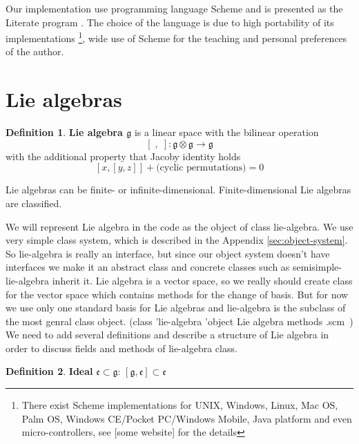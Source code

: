 \documentclass[a4paper,10pt]{article}%
\theoremstyle{definition} \newtheorem{Def}{Definition}
\begin{document}
Our implementation use programming language Scheme and is presented as the Literate program \cite{knuth1992literate}. The choice of the language is due to high portability of its implementations \footnote{There exist Scheme implementations for UNIX, Windows, Linux, Mac OS, Palm OS, Windows CE/Pocket PC/Windows Mobile, Java platform and even micro-controllers, see [some website] for the details}, wide use of Scheme for the teaching \cite{abelson1996structure} and personal preferences of the author. 

\section{Lie algebras}
\label{sec:lie-algebras}

\begin{Def}
  {\bf Lie algebra $\mathfrak{g}$} is a linear space with the bilinear operation
  \begin{equation}
    \label{eq:1}
    \left[\;,\;\right]:\mathfrak{g}\otimes \mathfrak{g}\to \mathfrak{g}
  \end{equation}
  with the additional property that Jacoby identity holds
  \begin{equation}
    \label{eq:2}
    [x,[y,z]]+\text{(cyclic permutations)}=0
  \end{equation}
\end{Def}
Lie algebras can be finite- or infinite-dimensional. Finite-dimensional Lie algebras are classified.

We will represent Lie algebra in the code as the object of class {\Tt{}lie-algebra\nwendquote}. We use very simple class system, which is described in the Appendix \ref{sec:object-system}. So {\Tt{}lie-algebra\nwendquote} is really an interface, but since our object system doesn't have interfaces we make it an abstract class and concrete classes such as {\Tt{}semisimple-lie-algebra\nwendquote} inherit it.
Lie algebra is a vector space, so we really should create class for the vector space which contains methods for the change of basis. But for now we use only one standard basis for Lie algebras and {\Tt{}lie-algebra\nwendquote} is the subclass of the most genral class {\Tt{}object\nwendquote}.
\nwenddocs{}\endmoddef\nwstartdeflinemarkup{}\nwenddeflinemarkup
(class 'lie-algebra 'object
       \LA{}Lie algebra methods .scm~{\nwtagstyle{}}\RA{})
\nwendcode{}\nwdocspar
We need to add several definitions and describe a structure of Lie algebra in order to discuss fields and methods of {\Tt{}lie-algebra\nwendquote} class.
\begin{Def}
  {\bf Ideal} $\mathfrak{e}\subset\mathfrak{g}$: $[\mathfrak{g},\mathfrak{e}]\subset \mathfrak{e}$
\end{Def}
\end{document}

